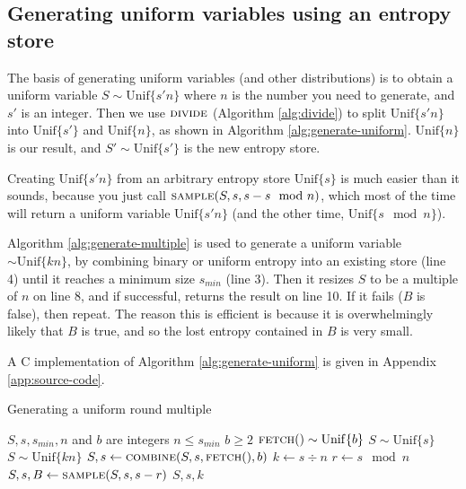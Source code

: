 \documentclass[12pt]{article}
\newcommand{\unif}[1]{\mathrm{Unif}\{#1\}}
\begin{document}
\subsection{Generating uniform variables using an entropy store}

The basis of generating uniform variables (and other distributions) is to obtain a uniform variable $S \sim \unif{s'n}$ where $n$ is the number you need to generate, and $s'$ is an integer. Then we use $\textsc{divide}$ (Algorithm \ref{alg:divide}) to split $\unif{s'n}$ into $\unif{s'}$ and $\unif{n}$, as shown in Algorithm \ref{alg:generate-uniform}. $\unif{n}$ is our result, and $S' \sim \unif{s'}$ is the new entropy store.

Creating $\unif{s'n}$ from an arbitrary entropy store $\unif{s}$ is much easier than it sounds, because you just call $\textsc{sample}(S, s, s - s \mod n)$, which most of the time will return a uniform variable $\unif{s'n}$ (and the other time, $\unif{s \mod n}$).

Algorithm \ref{alg:generate-multiple} is used to generate a uniform variable $\sim \unif{kn}$, by combining binary or uniform entropy into an existing store (line 4) until it reaches a minimum size $s_{min}$ (line 3). Then it resizes $S$ to be a multiple of $n$ on line 8, and if successful, returns the result on line 10. If it fails ($B$ is false), then repeat. The reason this is efficient is because it is overwhelmingly likely that $B$ is true, and so the lost entropy contained in $B$ is very small.

A C implementation of Algorithm \ref{alg:generate-uniform} is given in Appendix \ref{app:source-code}.

\begin{algorithm}
\caption{Generating a uniform round multiple}
\label{alg:generate-multiple}
\begin{algorithmic}[1]
\Require $S, s, s_{min}, n$ and $b$ are integers
\Require $n \le s_{min}$
\Require $b \ge 2$
\Require $\textsc{fetch}() \sim \unif{b}$
\Require $S \sim \unif{s}$
\Ensure $S \sim \unif{kn}$
        \State $S, s \gets \textsc{combine}(S, s, \textsc{fetch}(), b)$
    \EndWhile
    \State $k \gets s \div n$
    \State $r \gets s \mod n$
    \State $S, s, B \gets \textsc{sample}(S, s, s-r)$ 
        \State \Return $S, s, k$
    \EndIf
  \EndWhile
\EndProcedure
\end{algorithmic}
\end{algorithm}
\end{document}
